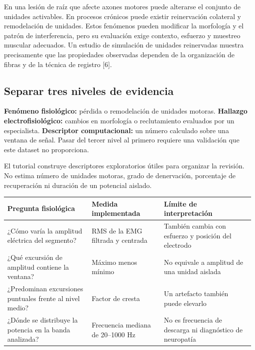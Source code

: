 \documentclass[
  spanish,
  10.5pt,
  a4paper,
  DIV=11,
  numbers=noendperiod]{scrartcl}
\newcounter{none} %
\begin{document}
En una lesión de raíz que afecte axones motores puede alterarse el
conjunto de unidades activables. En procesos crónicos puede existir
reinervación colateral y remodelación de unidades. Estos fenómenos
pueden modificar la morfología y el patrón de interferencia, pero su
evaluación exige contexto, esfuerzo y muestreo muscular adecuados. Un
estudio de simulación de unidades reinervadas muestra precisamente que
las propiedades observadas dependen de la organización de fibras y de la
técnica de registro {[}6{]}.

\subsection{Separar tres niveles de
evidencia}\label{separar-tres-niveles-de-evidencia}

\textbf{Fenómeno fisiológico:} pérdida o remodelación de unidades
motoras. \textbf{Hallazgo electrofisiológico:} cambios en morfología o
reclutamiento evaluados por un especialista. \textbf{Descriptor
computacional:} un número calculado sobre una ventana de señal. Pasar
del tercer nivel al primero requiere una validación que este dataset no
proporciona.

El tutorial construye descriptores exploratorios útiles para organizar
la revisión. No estima número de unidades motoras, grado de denervación,
porcentaje de recuperación ni duración de un potencial aislado.


{\def\LTcaptype{none} %
\begin{longtable}[]{@{}
  >{\raggedright\arraybackslash}p{}
  >{\raggedright\arraybackslash}p{}
  >{\raggedright\arraybackslash}p{}@{}}
\toprule\noalign{}
\begin{minipage}[b]{\linewidth}\raggedright
Pregunta fisiológica
\end{minipage} & \begin{minipage}[b]{\linewidth}\raggedright
Medida implementada
\end{minipage} & \begin{minipage}[b]{\linewidth}\raggedright
Límite de interpretación
\end{minipage} \\
\midrule\noalign{}
\endhead
\bottomrule\noalign{}
\endlastfoot
¿Cómo varía la amplitud eléctrica del segmento? & RMS de la EMG filtrada
y centrada & También cambia con esfuerzo y posición del electrodo \\
¿Qué excursión de amplitud contiene la ventana? & Máximo menos mínimo &
No equivale a amplitud de una unidad aislada \\
¿Predominan excursiones puntuales frente al nivel medio? & Factor de
cresta & Un artefacto también puede elevarlo \\
¿Dónde se distribuye la potencia en la banda analizada? & Frecuencia
mediana de 20--1000 Hz & No es frecuencia de descarga ni diagnóstico de
neuropatía \\
\end{longtable}
}
\end{document}
